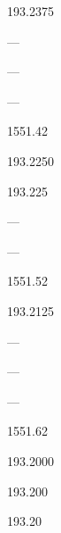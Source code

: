 \documentclass[letterpaper,10pt,english]{sphinxmanual}
\begin{document}
193.2375





—





—





—





1551.42









193.2250





193.225





—





—





1551.52









193.2125





—





—





—





1551.62









193.2000





193.200





193.20
\end{document}
